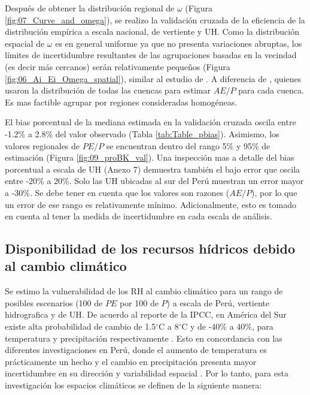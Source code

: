 \documentclass[12pt]{article}
\begin{document}
Después de obtener la distribución regional de $\omega$ (Figura \ref{fig:07_Curve_and_omega}), se realizo la validación cruzada de la eficiencia de la distribución empírica a escala nacional, de vertiente y UH. Como la distribución espacial de $\omega$ es en general uniforme ya que no presenta variaciones abruptas, los límites de incertidumbre resultantes de las agrupaciones basadas en la vecindad (es decir más cercanos) serán relativamente pequeños (Figura \ref{fig:06_Ai_Ei_Omega_spatial}), similar al estudio de \citet{Singh2015}. A diferencia de \citet{Greve2015}, quienes usaron la distribución de todas las cuencas para estimar $AE/P$ para cada cuenca. Es mas factible agrupar por regiones consideradas homogéneas.



El bias porcentual de la mediana estimada en la validación cruzada oscila entre -1.2\% a 2.8\% del valor observado (Tabla \ref{tab:Table_pbias}). Asimismo, los valores regionales de $PE/P$ se encuentran dentro del rango 5\% y 95\% de estimación (Figura \ref{fig:09_proBK_val}). Una inspección mas a detalle del bias porcentual a escala de UH (Anexo 7) demuestra también el bajo error que oscila entre -20\% a 20\%. Solo las UH ubicadas al sur del Perú muestran un error mayor a -30\%. Se debe tener en cuenta que los valores son razones ($AE/P$), por lo que un error de ese rango es relativamente mínimo. Adicionalmente, esto es tomado en cuenta al tener la medida de incertidumbre en cada escala de análisis.



\subsection{Disponibilidad de los recursos hídricos debido al cambio climático}

Se estimo la vulnerabilidad de los RH al cambio climático para un rango de posibles escenarios (100 de $PE$ por 100 de $P$) a escala de Perú, vertiente hidrografica y de UH. De acuerdo al reporte de la IPCC, en América del Sur existe alta probabilidad de cambio de 1.5$^{\circ}$C a 8$^{\circ}$C y de -40\% a 40\%, para temperatura y precipitación respectivamente
\citep{stocker2013climate}. Esto en concordancia con las diferentes investigaciones en Perú, donde el aumento de temperatura es prácticamente un hecho \citep{vuille2015impact,rosas2016towards,lopez2016recent,vicente2018recent,hunziker2018effects} y el cambio en precipitación presenta mayor incertidumbre en su dirección y variabilidad espacial \citep{zubieta2017spatial,de2017can,Aybar2019}. Por lo tanto, para esta investigación los espacios climáticos se definen de la siguiente manera:
\end{document}
